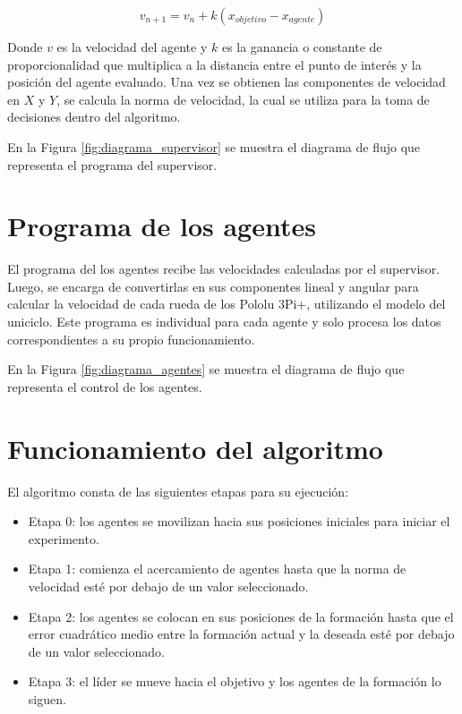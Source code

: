 \begin{equation}
	v_{n+1} = v_n + k(x_{objetivo} - x_{agente})
	\label{eq:controlador_proporcional}
\end{equation}

Donde $v$ es la velocidad del agente y $k$ es la ganancia o constante de proporcionalidad que multiplica a la distancia entre el punto de interés y la posición del agente evaluado. Una vez se obtienen las componentes de velocidad en $X$ y $Y$, se calcula la norma de velocidad, la cual se utiliza para la toma de decisiones dentro del algoritmo.

En la Figura \ref{fig:diagrama_supervisor} se muestra el diagrama de flujo que representa el programa del supervisor.

\section{Programa de los agentes}
El programa del los agentes recibe las velocidades calculadas por el supervisor. Luego, se encarga de convertirlas en sus componentes lineal y angular para calcular la velocidad de cada rueda de los Pololu 3Pi+, utilizando el modelo del uniciclo. Este programa es individual para cada agente y solo procesa los datos correspondientes a su propio funcionamiento.

En la Figura \ref{fig:diagrama_agentes} se muestra el diagrama de flujo que representa el control de los agentes.

\section{Funcionamiento del algoritmo}
El algoritmo consta de las siguientes etapas para su ejecución:
\begin{itemize}
	\item Etapa 0: los agentes se movilizan hacia sus posiciones iniciales para iniciar el experimento.
	\item Etapa 1: comienza el acercamiento de agentes hasta que la norma de velocidad esté por debajo de un valor seleccionado.
	\item Etapa 2: los agentes se colocan en sus posiciones de la formación hasta que el error cuadrático medio entre la formación actual y la deseada esté por debajo de un valor seleccionado.
	\item Etapa 3: el líder se mueve hacia el objetivo y los agentes de la formación lo siguen.
\end{itemize}

